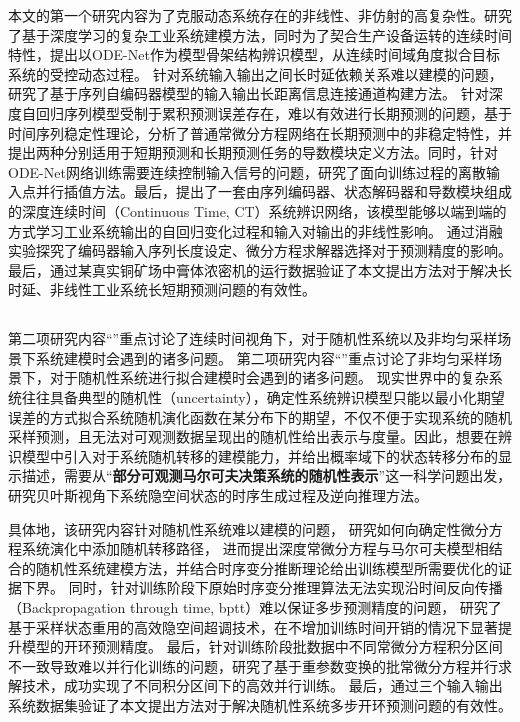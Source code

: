 本文的第一个研究内容为了克服动态系统存在的非线性、非仿射的高复杂性。研究了基于深度学习的复杂工业系统建模方法，同时为了契合生产设备运转的连续时间特性，提出以ODE-Net作为模型骨架结构辨识模型，从连续时间域角度拟合目标系统的受控动态过程。
针对系统输入输出之间长时延依赖关系难以建模的问题，研究了基于序列自编码器模型的输入输出长距离信息连接通道构建方法。
针对深度自回归序列模型受制于累积预测误差存在，难以有效进行长期预测的问题，基于时间序列稳定性理论，分析了普通常微分方程网络在长期预测中的非稳定特性，并提出两种分别适用于短期预测和长期预测任务的导数模块定义方法。同时，针对ODE-Net网络训练需要连续控制输入信号的问题，研究了面向训练过程的离散输入点并行插值方法。最后，提出了一套由序列编码器、状态解码器和导数模块组成的深度连续时间（Continuous Time, CT）系统辨识网络，该模型能够以端到端的方式学习工业系统输出的自回归变化过程和输入对输出的非线性影响。
通过消融实验探究了编码器输入序列长度设定、微分方程求解器选择对于预测精度的影响。最后，通过某真实铜矿场中膏体浓密机的运行数据验证了本文提出方法对于解决长时延、非线性工业系统长短期预测问题的有效性。






\subsection{\TitlechapterII}

第二项研究内容“\TitlechapterII”重点讨论了连续时间视角下，对于随机性系统以及非均匀采样场景下系统建模时会遇到的诸多问题。
第二项研究内容“\TitlechapterII”重点讨论了非均匀采样场景下，对于随机性系统进行拟合建模时会遇到的诸多问题。
现实世界中的复杂系统往往具备典型的随机性（uncertainty），确定性系统辨识模型只能以最小化期望误差的方式拟合系统随机演化函数在某分布下的期望，不仅不便于实现系统的随机采样预测，且无法对可观测数据呈现出的随机性给出表示与度量。因此，想要在辨识模型中引入对于系统随机转移的建模能力，并给出概率域下的状态转移分布的显示描述，需要从“\textbf{部分可观测马尔可夫决策系统的随机性表示}”这一科学问题出发，研究贝叶斯视角下系统隐空间状态的时序生成过程及逆向推理方法。

具体地，该研究内容针对随机性系统难以建模的问题，
研究如何向确定性微分方程系统演化中添加随机转移路径，
进而提出深度常微分方程与马尔可夫模型相结合的随机性系统建模方法，并结合时序变分推断理论给出训练模型所需要优化的证据下界。
同时，针对训练阶段下原始时序变分推理算法无法实现沿时间反向传播（Backpropagation through time, bptt）难以保证多步预测精度的问题，
研究了基于采样状态重用的高效隐空间超调技术，在不增加训练时间开销的情况下显著提升模型的开环预测精度。
最后，针对训练阶段批数据中不同常微分方程积分区间不一致导致难以并行化训练的问题，研究了基于重参数变换的批常微分方程并行求解技术，成功实现了不同积分区间下的高效并行训练。
最后，通过三个输入输出系统数据集验证了本文提出方法对于解决随机性系统多步开环预测问题的有效性。


